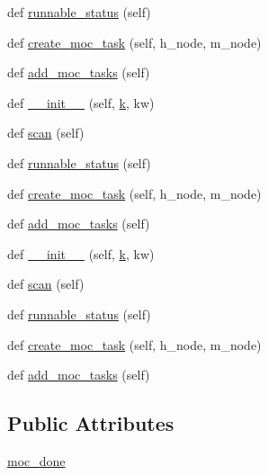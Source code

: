 \begin{DoxyCompactItemize}
\item 
def \hyperlink{classwaflib_1_1_tools_1_1qt4_1_1qxx_aa3fd0759668664632f019ae7c118406d}{runnable\+\_\+status} (self)
\item 
def \hyperlink{classwaflib_1_1_tools_1_1qt4_1_1qxx_aff019276ea1c24be0da32fb4a6d3da06}{create\+\_\+moc\+\_\+task} (self, h\+\_\+node, m\+\_\+node)
\item 
def \hyperlink{classwaflib_1_1_tools_1_1qt4_1_1qxx_aec5aad1a23675343a8b270b0e8c15b0c}{add\+\_\+moc\+\_\+tasks} (self)
\item 
def \hyperlink{classwaflib_1_1_tools_1_1qt4_1_1qxx_a7bc6ffa8a31c2b612eb2fac82ab4c052}{\+\_\+\+\_\+init\+\_\+\+\_\+} (self, \hyperlink{rfft2d_test_m_l_8m_adc468c70fb574ebd07287b38d0d0676d}{k}, kw)
\item 
def \hyperlink{classwaflib_1_1_tools_1_1qt4_1_1qxx_acdd5c674e2585b425a25735b665eeb14}{scan} (self)
\item 
def \hyperlink{classwaflib_1_1_tools_1_1qt4_1_1qxx_aa3fd0759668664632f019ae7c118406d}{runnable\+\_\+status} (self)
\item 
def \hyperlink{classwaflib_1_1_tools_1_1qt4_1_1qxx_aff019276ea1c24be0da32fb4a6d3da06}{create\+\_\+moc\+\_\+task} (self, h\+\_\+node, m\+\_\+node)
\item 
def \hyperlink{classwaflib_1_1_tools_1_1qt4_1_1qxx_aec5aad1a23675343a8b270b0e8c15b0c}{add\+\_\+moc\+\_\+tasks} (self)
\item 
def \hyperlink{classwaflib_1_1_tools_1_1qt4_1_1qxx_a7bc6ffa8a31c2b612eb2fac82ab4c052}{\+\_\+\+\_\+init\+\_\+\+\_\+} (self, \hyperlink{rfft2d_test_m_l_8m_adc468c70fb574ebd07287b38d0d0676d}{k}, kw)
\item 
def \hyperlink{classwaflib_1_1_tools_1_1qt4_1_1qxx_acdd5c674e2585b425a25735b665eeb14}{scan} (self)
\item 
def \hyperlink{classwaflib_1_1_tools_1_1qt4_1_1qxx_aa3fd0759668664632f019ae7c118406d}{runnable\+\_\+status} (self)
\item 
def \hyperlink{classwaflib_1_1_tools_1_1qt4_1_1qxx_aff019276ea1c24be0da32fb4a6d3da06}{create\+\_\+moc\+\_\+task} (self, h\+\_\+node, m\+\_\+node)
\item 
def \hyperlink{classwaflib_1_1_tools_1_1qt4_1_1qxx_aec5aad1a23675343a8b270b0e8c15b0c}{add\+\_\+moc\+\_\+tasks} (self)
\end{DoxyCompactItemize}
\subsection*{Public Attributes}
\begin{DoxyCompactItemize}
\item 
\hyperlink{classwaflib_1_1_tools_1_1qt4_1_1qxx_a671993f2eb119aeff79f5f3563844166}{moc\+\_\+done}
\end{DoxyCompactItemize}
